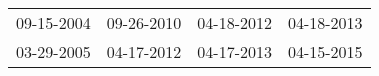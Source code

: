 \begin{supertabular}{llll}
 09-15-2004 &  09-26-2010 &  04-18-2012 &  04-18-2013 \\
 03-29-2005 &  04-17-2012 &  04-17-2013 &  04-15-2015 \\
\end{supertabular}
